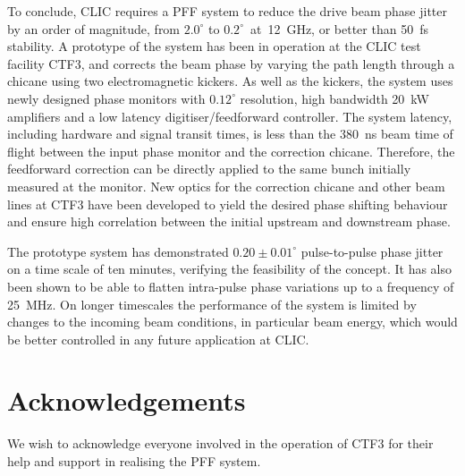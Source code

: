 \documentclass[%
 reprint,
superscriptaddress,
 amsmath,amssymb,
 prl,
]{revtex4-1}
\begin{document}

To conclude, CLIC requires a PFF system to reduce the drive beam phase jitter 
by an order of magnitude, from \(2.0^\circ\) to \(0.2^\circ\)~at~12~GHz, or 
better than 50~fs stability. A prototype of the system has been 
in operation at the CLIC test facility CTF3, and corrects the beam phase by 
varying the path length through a chicane using two electromagnetic kickers. 
As well as the kickers, the system uses newly designed phase monitors with 
\(0.12^\circ\) resolution, high bandwidth 20~kW amplifiers and a low latency 
digitiser/feedforward controller. The system latency, including hardware and 
signal transit times, is less than the 380~ns beam time of flight between the 
input phase monitor and the correction chicane. Therefore, the feedforward 
correction can be directly applied to the same bunch initially measured at the 
monitor. New optics for the correction chicane and other beam lines at CTF3 
have been 
developed to yield the desired phase shifting behaviour and ensure high 
correlation between the initial upstream and downstream phase.

The prototype system has demonstrated \(0.20\pm0.01^\circ\) pulse-to-pulse 
phase jitter on a time scale of ten minutes, verifying the feasibility of the 
concept. It has also been shown to be able 
to flatten intra-pulse phase variations up to a frequency of 25~MHz. On longer 
timescales the performance of the system is limited by changes to the incoming 
beam conditions, in particular beam energy, which would be better controlled in 
any future application at CLIC.



\section{\label{s:ack}Acknowledgements}
\begin{acknowledgments}
	We wish to acknowledge everyone involved in the operation of CTF3 for their 
	help and support in realising the PFF system.
\end{acknowledgments}
\end{document}
